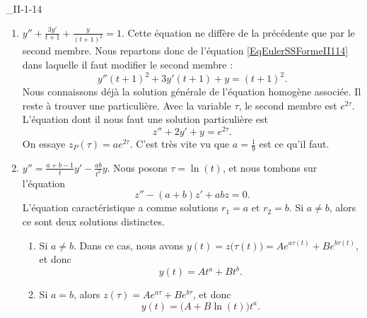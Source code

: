 \begin{corrige}{_II-1-14}
\begin{enumerate}
\item
$y''+\frac{ 3y' }{ t+1 }+\frac{ y }{ (t+1)^2 }=1$.
Cette équation ne diffère de la précédente que par le second membre. Nous repartons donc de l'équation \eqref{EqEulerSSFormeII114} dans laquelle il faut modifier le second membre :
\begin{equation}
	y''(t+1)^2+3y'(t+1)+y=(t+1)^2.
\end{equation}
Nous connaissons déjà la solution générale de l'équation homogène associée. Il reste à trouver une particulière. Avec la variable $\tau$, le second membre est $ e^{2\tau}$. L'équation dont il nous faut une solution particulière est
\begin{equation}
	z''+2y'+y= e^{2\tau}.
\end{equation}
On essaye $z_P(\tau)=a e^{2\tau}$. C'est très vite vu que $a=\frac{1}{ 9 }$ est ce qu'il faut.

\item
$y''=\frac{ a+b-1 }{ t }y'-\frac{ ab }{ t^2 }y$.
Nous posons $\tau=\ln(t)$, et nous tombons sur l'équation
\begin{equation}
	z''-(a+b)z'+abz=0.
\end{equation}
L'équation caractéristique a comme solutions $r_1=a$ et $r_2=b$. Si $a\neq b$, alors ce sont deux solutions distinctes.

\begin{enumerate}
\item Si $a\neq b$. Dans ce cas, nous avons $y(t)=z\big( \tau(t) \big)=A e^{a\tau(t)}+B e^{b\tau(t)}$, et donc
\begin{equation}
	y(t)=At^a+Bt^b.
\end{equation}
\item Si $a=b$, alors $z(\tau)=A e^{a\tau}+B e^{b\tau}$, et donc
\begin{equation}
	y(t)=\big( A+B\ln(t) \big)t^a.
\end{equation}
\end{enumerate}

\end{enumerate}

\end{corrige}


